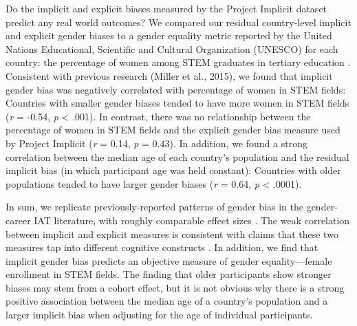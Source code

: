 \documentclass[9pt,twocolumn,twoside]{pnas-new}
\begin{document}
Do the implicit and explicit biases measured by the Project Implicit
dataset predict any real world outcomes? We compared our residual
country-level implicit and explicit gender biases to a gender equality
metric reported by the United Nations Educational, Scientific and
Cultural Organization (UNESCO) for each country: the percentage of women
among STEM graduates in tertiary education  \cite{miller2015women,stoet2018gender}.  Consistent with previous research
(Miller et al., 2015), we found that implicit gender bias was negatively
correlated with percentage of women in STEM fields: Countries with
smaller gender biases tended to have more women in STEM fields (\emph{r}
= -0.54, \emph{p} \textless{} .001). In contrast, there was no
relationship between the percentage of women in STEM fields and the
explicit gender bias measure used by Project Implicit (\emph{r} = 0.14,
\emph{p} = 0.43). In addition, we found a strong correlation between the
median age of each country's population \cite{ciafactbook} and the residual implicit bias (in which participant age
was held constant): Countries with older populations tended to have
larger gender biases (\emph{r} = 0.64, \emph{p} \textless{} .0001).



In sum, we replicate previously-reported patterns of gender bias in the
gender-career IAT literature, with roughly comparable effect sizes \citep[c.f.][]{nosek2002harvesting}.
The weak correlation between implicit and
explicit measures is consistent with claims that these two measures tap
into different cognitive constructs \cite{forscher2016meta}. In
addition, we find that implicit gender bias predicts an objective measure of gender equality---female enrollment in STEM fields. The
finding that older participants show stronger biases may stem from a
cohort effect, but it is not obvious why there is a strong positive
association between the median age of a country's population and a
larger implicit bias when adjusting for the age of individual
participants.
\end{document}
